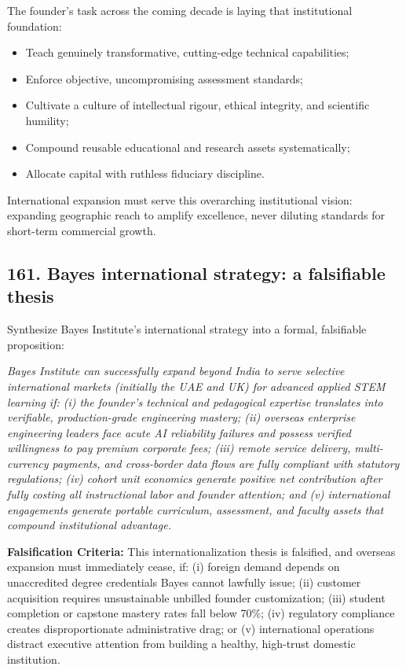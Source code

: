 The founder's task across the coming decade is laying that institutional foundation:
\begin{itemize}
    \item Teach genuinely transformative, cutting-edge technical capabilities;
    \item Enforce objective, uncompromising assessment standards;
    \item Cultivate a culture of intellectual rigour, ethical integrity, and scientific humility;
    \item Compound reusable educational and research assets systematically;
    \item Allocate capital with ruthless fiduciary discipline.
\end{itemize}
International expansion must serve this overarching institutional vision: expanding geographic reach to amplify excellence, never diluting standards for short-term commercial growth.

\subsection{161. Bayes international strategy: a falsifiable thesis}

Synthesize Bayes Institute's international strategy into a formal, falsifiable proposition:
\begin{tcolorbox}[colback=BayesCanvas,colframe=BayesTeal,arc=1mm,title=\textbf{Bayes Institute International Strategy Thesis}]
\itshape
Bayes Institute can successfully expand beyond India to serve selective international markets (initially the UAE and UK) for advanced applied STEM learning if: (i) the founder's technical and pedagogical expertise translates into verifiable, production-grade engineering mastery; (ii) overseas enterprise engineering leaders face acute AI reliability failures and possess verified willingness to pay premium corporate fees; (iii) remote service delivery, multi-currency payments, and cross-border data flows are fully compliant with statutory regulations; (iv) cohort unit economics generate positive net contribution after fully costing all instructional labor and founder attention; and (v) international engagements generate portable curriculum, assessment, and faculty assets that compound institutional advantage.

\textbf{Falsification Criteria:} This internationalization thesis is falsified, and overseas expansion must immediately cease, if: (i) foreign demand depends on unaccredited degree credentials Bayes cannot lawfully issue; (ii) customer acquisition requires unsustainable unbilled founder customization; (iii) student completion or capstone mastery rates fall below 70\%; (iv) regulatory compliance creates disproportionate administrative drag; or (v) international operations distract executive attention from building a healthy, high-trust domestic institution.
\end{tcolorbox}
